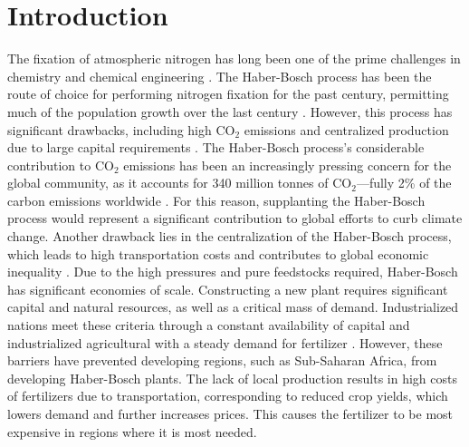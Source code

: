 \section{Introduction}
The fixation of atmospheric nitrogen has long been one of the prime challenges in chemistry and chemical engineering \cite{ritter_18, Schloegl_2003}. The Haber-Bosch process has been the route of choice for performing nitrogen fixation for the past century, permitting much of the population growth over the last century \cite{Smil_1999}. However, this process has significant drawbacks, including high CO$_2$ emissions and centralized production due to large capital requirements \cite{Comer_2019}. The Haber-Bosch process's considerable contribution to CO$_2$ emissions has been an increasingly pressing concern for the global community, as it accounts for 340 million tonnes of CO$_2$---fully 2\% of the carbon emissions worldwide \cite{gross_12, Schiffer_2017}. For this reason, supplanting the Haber-Bosch process would represent a significant contribution to global efforts to curb climate change. Another drawback lies in the centralization of the Haber-Bosch process, which leads to high transportation costs and contributes to global economic inequality \cite{Comer_2019}.  Due to the high pressures and pure feedstocks required, Haber-Bosch has significant economies of scale. Constructing a new plant requires significant capital and natural resources, as well as a critical mass of demand. Industrialized nations meet these criteria through a constant availability of capital and industrialized agricultural with a steady demand for fertilizer \cite{McArthur_2017}. However, these barriers have prevented developing regions, such as Sub-Saharan Africa, from developing Haber-Bosch plants. The lack of local production results in high costs of fertilizers due to transportation, corresponding to reduced crop yields, which lowers demand and further increases prices. \cite{IFDC_2012} This causes the fertilizer to be most expensive in regions where it is most needed.

